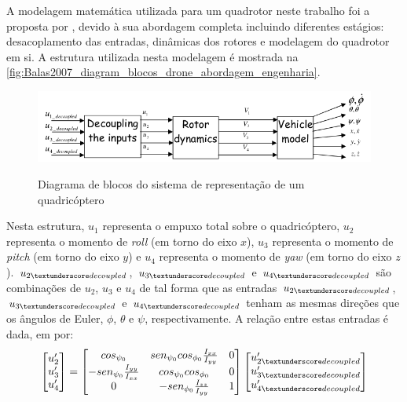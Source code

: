 A modelagem matemática utilizada para um quadrotor neste trabalho foi a proposta por , devido à sua abordagem completa incluindo diferentes estágios: desacoplamento das entradas, dinâmicas dos rotores e modelagem do quadrotor em si. A estrutura utilizada nesta modelagem é mostrada na \autoref{fig:Balas2007_diagram_blocos_drone_abordagem_engenharia}.

\begin{figure}[!htb]
    \centering
    \caption{Diagrama de blocos do sistema de representação de um quadricóptero}
    \includegraphics[width=1\textwidth]{./04-figuras/Balas2007_diagram_blocos_drone_abordagem_engenharia}
    \label{fig:Balas2007_diagram_blocos_drone_abordagem_engenharia}
\end{figure}

Nesta estrutura, $u_1$ representa o empuxo total sobre o quadricóptero, $u_2$ representa o momento de \textit{roll} (em torno do eixo $x$), $u_3$ representa o momento de \textit{pitch} (em torno do eixo $y$) e $u_4$ representa o momento de \textit{yaw} (em torno do eixo $z$). $u_{2\textunderscore decoupled}$, $u_{3\textunderscore decoupled}$ e $u_{4\textunderscore decoupled}$ são combinações de $u_2$, $u_3$ e $u_4$ de tal forma que as entradas $u_{2\textunderscore decoupled}$, $u_{3\textunderscore decoupled}$ e $u_{4\textunderscore decoupled}$ tenham as mesmas direções que os ângulos de Euler, $\phi$, $\theta$ e $\psi$, respectivamente. A relação entre estas entradas é dada, em \cite[p.~49]{Balas2007} por:
\[
	\begin{bmatrix}
		u'_{2} \\
		u'_{3} \\
		u'_{4}
	\end{bmatrix} = 
	\begin{bmatrix}
		cos_{\psi_{0}} & sen_{\psi_{0}}cos_{\phi_{0}}\frac{I_{xx}}{I_{yy}} & 
		0 \\
		
		-sen_{\psi_{0}}\frac{I_{yy}}{I_{xx}} &
		cos_{\psi_{0}}cos_{\phi_{0}} &
		0 \\
		
		0 &
		-sen_{\phi_{0}}\frac{I_{zz}}{I_{yy}} &
		1
	\end{bmatrix}
	\begin{bmatrix}
		u'_{2\textunderscore decoupled} \\
		u'_{3\textunderscore decoupled} \\
		u'_{4\textunderscore decoupled}
	\end{bmatrix}
\]

